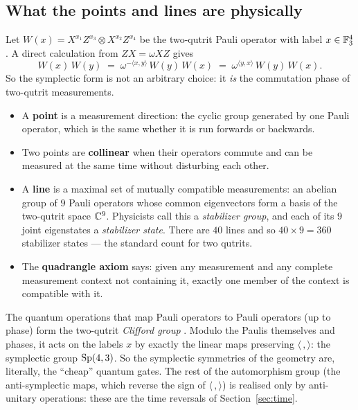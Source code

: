 \subsection{What the points and lines are physically}

Let $W(x)=X^{x_1}Z^{x_3}\otimes X^{x_2}Z^{x_4}$ be the two-qutrit Pauli operator with
label $x\in\mathbb{F}_3^4$. A direct calculation from $ZX=\omega XZ$ gives
\begin{equation}\label{eq:commutation}
W(x)\,W(y)\;=\;\omega^{-\langle x,y\rangle}\,W(y)\,W(x)\;=\;\omega^{\langle y,x\rangle}\,W(y)\,W(x).
\end{equation}
So the symplectic form is not an arbitrary choice: it \emph{is} the commutation phase of
two-qutrit measurements.

\begin{physical}
\begin{itemize}[leftmargin=1.2em]
\item A \textbf{point} is a measurement direction: the cyclic group generated by one
      Pauli operator, which is the same whether it is run forwards or backwards.
\item Two points are \textbf{collinear} when their operators commute and can be measured
      at the same time without disturbing each other.
\item A \textbf{line} is a maximal set of mutually compatible measurements: an abelian
      group of $9$ Pauli operators whose common eigenvectors form a basis of the
      two-qutrit space $\mathbb{C}^9$. Physicists call this a \emph{stabilizer group}, and each
      of its $9$ joint eigenstates a \emph{stabilizer state}. There are $40$ lines and
      so $40\times9=360$ stabilizer states --- the standard count for two qutrits.
\item The \textbf{quadrangle axiom} says: given any measurement and any complete
      measurement context not containing it, exactly one member of the context is
      compatible with it.
\end{itemize}
\end{physical}

The quantum operations that map Pauli operators to Pauli operators (up to phase) form the
two-qutrit \emph{Clifford group} \cite{GHW}. Modulo the Paulis themselves and phases, it acts on the
labels $x$ by exactly the linear maps preserving $\langle\,,\rangle$: the symplectic
group $\mathrm{Sp}(4,3)$. So the symplectic symmetries of the geometry are, literally, the ``cheap'' quantum
gates. The rest of the automorphism group (the anti-symplectic maps, which reverse the sign of
$\langle\,,\rangle$) is realised only by anti-unitary operations: these are the time
reversals of Section~\ref{sec:time}.

